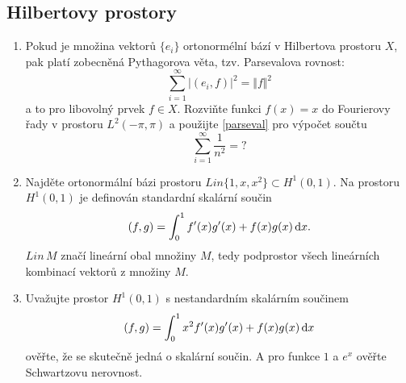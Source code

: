\documentclass[a4paper,10pt]{article}
\def\d{\,{\rm d}}               %
\def\dx{\d x}
\def\Lin{\mathit{Lin}}
\def\abs#1{\lvert#1\rvert}
\def\norm#1{\bigl\Vert#1\bigr\Vert} %
\begin{document}
 \subsection{Hilbertovy prostory}
 \begin{enumerate}
  \item Pokud je množina vektorů $\{e_i\}$ ortonormélní bází v Hilbertova prostoru $X$, pak platí zobecněná Pythagorova věta, tzv. Parsevalova rovnost:
  \begin{equation}\label{parseval}
      \sum_{i=1}^\infty \abs{(e_i, f)}^2 = \norm{f}^2
  \end{equation}
  a to pro libovolný prvek $f\in X$. Rozviňte funkci $f(x)=x$ do Fourierovy řady v prostoru $L^2(-\pi,\pi)$ a použijte 
  \eqref{parseval} pro výpočet součtu 
  \[
     \sum_{i=1}^\infty \frac{1}{n^2} = ?
  \]
  \item Najděte ortonormální bázi prostoru $\Lin\{1,x,x^2\}\subset H^1(0,1)$. Na prostoru $H^1(0,1)$ je definován standardní skalární součin
  \[
     (f,g)= \int_0^1 f'(x)g'(x)+f(x)g(x) \dx. 
  \]
  $\Lin\, M$ značí lineární obal množiny $M$, tedy podprostor všech lineárních kombinací vektorů z množiny $M$.
  \item Uvažujte prostor $H^1(0,1)$ s nestandardním skalárním součinem 
  \[
     (f,g)=\int_0^1 x^2 f'(x) g'(x) +f(x) g(x) \dx
  \]
  ověřte, že se skutečně jedná o skalární součin. A pro funkce $1$ a $e^x$ ověřte Schwartzovu nerovnost.
 \end{enumerate}
\end{document}
